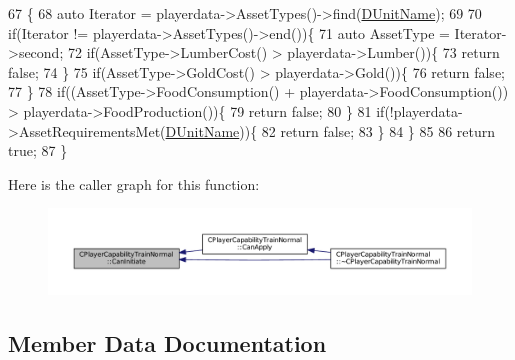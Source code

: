 \begin{DoxyCode}
67                                                                                                            
                     \{
68     \textcolor{keyword}{auto} Iterator = playerdata->AssetTypes()->find(\hyperlink{classCPlayerCapabilityTrainNormal_aed40686355e78c151910e23ea2d9d32c}{DUnitName});
69     
70     \textcolor{keywordflow}{if}(Iterator != playerdata->AssetTypes()->end())\{
71         \textcolor{keyword}{auto} AssetType = Iterator->second;
72         \textcolor{keywordflow}{if}(AssetType->LumberCost() > playerdata->Lumber())\{
73             \textcolor{keywordflow}{return} \textcolor{keyword}{false};   
74         \}
75         \textcolor{keywordflow}{if}(AssetType->GoldCost() > playerdata->Gold())\{
76             \textcolor{keywordflow}{return} \textcolor{keyword}{false};   
77         \}
78         \textcolor{keywordflow}{if}((AssetType->FoodConsumption() + playerdata->FoodConsumption()) > playerdata->FoodProduction())\{
79             \textcolor{keywordflow}{return} \textcolor{keyword}{false};    
80         \}
81         \textcolor{keywordflow}{if}(!playerdata->AssetRequirementsMet(\hyperlink{classCPlayerCapabilityTrainNormal_aed40686355e78c151910e23ea2d9d32c}{DUnitName}))\{
82             \textcolor{keywordflow}{return} \textcolor{keyword}{false};
83         \}
84     \}
85     
86     \textcolor{keywordflow}{return} \textcolor{keyword}{true};
87 \}
\end{DoxyCode}
Here is the caller graph for this function\+:\nopagebreak
\begin{figure}[H]
\begin{center}
\leavevmode
\includegraphics[width=350pt]{classCPlayerCapabilityTrainNormal_ac49cf646b94220844a03b7c3a8a7f215_icgraph}
\end{center}
\end{figure}


\subsection{Member Data Documentation}
\hypertarget{classCPlayerCapabilityTrainNormal_a20934470ff6a9ba1cba5969dba8102e4}{}\label{classCPlayerCapabilityTrainNormal_a20934470ff6a9ba1cba5969dba8102e4} 
